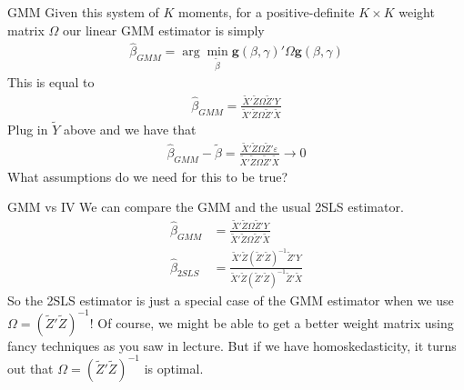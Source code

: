 \begin{frame}{GMM}
    Given this system of $K$ moments, for a positive-definite $K \times K$ weight matrix $\Omega$ our linear GMM estimator is simply
    \begin{align*}
        \hat{\beta}_{GMM} = \arg \min_{\tilde{\beta}} \mathbf{g}(\beta, \gamma)' \Omega \mathbf{g}(\beta, \gamma)
    \end{align*}
    This is equal to
    \begin{align*}
        \hat{\beta}_{GMM} = \frac{\tilde{X}'\tilde{Z} \Omega \tilde{Z}' Y}{\tilde{X}' \tilde{Z} \Omega \tilde{Z}' \tilde{X}}
    \end{align*}
    Plug in $\tilde{Y}$ above and we have that
    \begin{align*}
        \hat{\beta}_{GMM} - \tilde{\beta} = \frac{\tilde{X}'\tilde{Z} \Omega \tilde{Z}' \varepsilon}{\tilde{X}' \tilde{Z} \Omega \tilde{Z}' \tilde{X}} \xrightarrow[]{} 0
    \end{align*}
    What assumptions do we need for this to be true?
\end{frame}

\begin{frame}{GMM vs IV}
    We can compare the GMM and the usual 2SLS estimator.
    \begin{align*}
        \hat{\beta}_{GMM} &= \frac{\tilde{X}'\tilde{Z} \Omega \tilde{Z}' Y}{\tilde{X}' \tilde{Z} \Omega \tilde{Z}' \tilde{X}}
        \\
        \hat{\beta}_{2SLS} &= \frac{\tilde{X}'\tilde{Z} (\tilde{Z}' \tilde{Z})^{-1} \tilde{Z}' Y}  {\tilde{X}' \tilde{Z} (\tilde{Z}' \tilde{Z})^{-1} \tilde{Z}' \tilde{X}}
    \end{align*}
    So the 2SLS estimator is just a special case of the GMM estimator when we use $\Omega = (\tilde{Z}' \tilde{Z})^{-1}$! Of course, we might be able to get a better weight matrix using fancy techniques as you saw in lecture. But if we have homoskedasticity, it turns out that $\Omega = (\tilde{Z}' \tilde{Z})^{-1}$ is optimal.
\end{frame} 